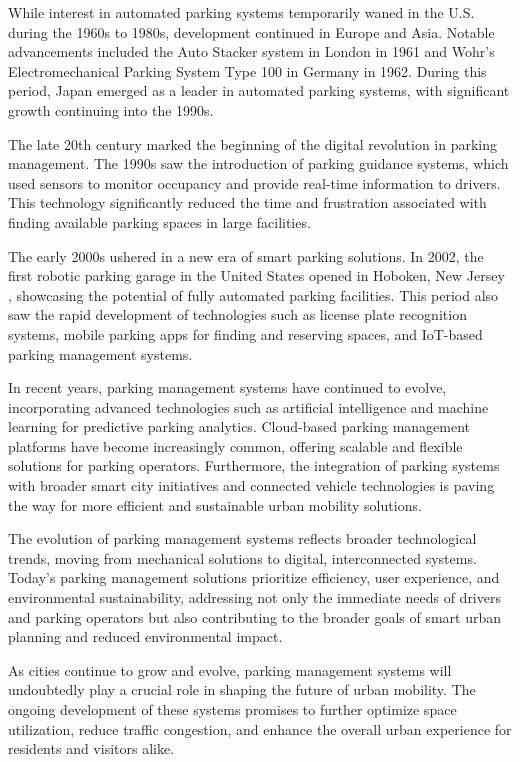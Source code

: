 While interest in automated parking systems temporarily waned in the U.S. during the 1960s to 1980s, development continued in Europe and Asia. Notable advancements included the Auto Stacker system in London in 1961 and Wohr's Electromechanical Parking System Type 100 \autocite{hardingaps2021history} in Germany in 1962. During this period, Japan emerged as a leader in automated parking systems, with significant growth continuing into the 1990s.

The late 20th century marked the beginning of the digital revolution in parking management. The 1990s saw the introduction of parking guidance systems, which used sensors to monitor occupancy and provide real-time information to drivers. This technology significantly reduced the time and frustration associated with finding available parking spaces in large facilities.

The early 2000s ushered in a new era of smart parking solutions. In 2002, the first robotic parking garage in the United States opened in Hoboken, New Jersey \autocite{usatoday2007robotic}, showcasing the potential of fully automated parking facilities. This period also saw the rapid development of technologies such as license plate recognition systems, mobile parking apps for finding and reserving spaces, and IoT-based parking management systems.

In recent years, parking management systems have continued to evolve, incorporating advanced technologies such as artificial intelligence and machine learning for predictive parking analytics. Cloud-based parking management platforms have become increasingly common, offering scalable and flexible solutions for parking operators. Furthermore, the integration of parking systems with broader smart city initiatives and connected vehicle technologies is paving the way for more efficient and sustainable urban mobility solutions.

The evolution of parking management systems reflects broader technological trends, moving from mechanical solutions to digital, interconnected systems. Today's parking management solutions prioritize efficiency, user experience, and environmental sustainability, addressing not only the immediate needs of drivers and parking operators but also contributing to the broader goals of smart urban planning and reduced environmental impact.

As cities continue to grow and evolve, parking management systems will undoubtedly play a crucial role in shaping the future of urban mobility. The ongoing development of these systems promises to further optimize space utilization, reduce traffic congestion, and enhance the overall urban experience for residents and visitors alike.
